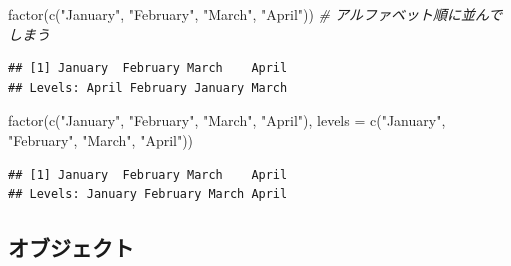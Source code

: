 \documentclass[
]{ltjsarticle}
\newenvironment{Shaded}{\begin{snugshade}}{\end{snugshade}}
\newcommand{\AttributeTok}[1]{\textcolor[rgb]{0.77,0.63,0.00}{#1}}
\newcommand{\CommentTok}[1]{\textcolor[rgb]{0.56,0.35,0.01}{\textit{#1}}}
\newcommand{\FunctionTok}[1]{\textcolor[rgb]{0.00,0.00,0.00}{#1}}
\newcommand{\NormalTok}[1]{#1}
\newcommand{\StringTok}[1]{\textcolor[rgb]{0.31,0.60,0.02}{#1}}
\begin{document}
\begin{Shaded}
\begin{Highlighting}[]
\FunctionTok{factor}\NormalTok{(}\FunctionTok{c}\NormalTok{(}\StringTok{"January"}\NormalTok{, }\StringTok{"February"}\NormalTok{, }\StringTok{"March"}\NormalTok{, }\StringTok{"April"}\NormalTok{)) }\CommentTok{\# アルファベット順に並んでしまう}
\end{Highlighting}
\end{Shaded}

\begin{verbatim}
## [1] January  February March    April   
## Levels: April February January March
\end{verbatim}

\begin{Shaded}
\begin{Highlighting}[]
\FunctionTok{factor}\NormalTok{(}\FunctionTok{c}\NormalTok{(}\StringTok{"January"}\NormalTok{, }\StringTok{"February"}\NormalTok{, }\StringTok{"March"}\NormalTok{, }\StringTok{"April"}\NormalTok{), }
       \AttributeTok{levels =} \FunctionTok{c}\NormalTok{(}\StringTok{"January"}\NormalTok{, }\StringTok{"February"}\NormalTok{, }\StringTok{"March"}\NormalTok{, }\StringTok{"April"}\NormalTok{))}
\end{Highlighting}
\end{Shaded}

\begin{verbatim}
## [1] January  February March    April   
## Levels: January February March April
\end{verbatim}

\hypertarget{ux30aaux30d6ux30b8ux30a7ux30afux30c8}{%
\subsection{オブジェクト}\label{ux30aaux30d6ux30b8ux30a7ux30afux30c8}}
\end{document}
